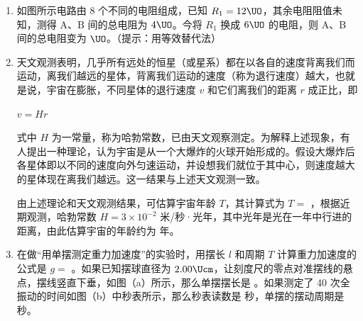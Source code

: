 \documentclass[\gkver]{gaokaozhenti}
\begin{document}
\begin{enumerate}
\item
如图所示电路由 8 个不同的电阻组成，已知 $R_{1} = 12\UO$，其余电阻阻值未知，测得 A、B 间的总电阻为 $4\UO$。今将 $R_{1}$ 换成 $6\UO$ 的电阻，则 A、B 间的总电阻变为  $\UO$。（提示：用等效替代法）
\onepicture[h=4cm, align=right]{}

\item
天文观测表明，几乎所有远处的恒星（或星系）都在以各自的速度背离我们而运动，离我们越远的星体，背离我们运动的速度（称为退行速度）越大，也就是说，宇宙在膨胀，不同星体的退行速度 $v$ 和它们离我们的距离 $r$ 成正比，即

$v = Hr$

式中 $H$ 为一常量，称为哈勃常数，已由天文观察测定。为解释上述现象，有人提出一种理论，认为宇宙是从一个大爆炸的火球开始形成的。假设大爆炸后各星体即以不同的速度向外匀速运动，并设想我们就位于其中心，则速度越大的星体现在离我们越远。这一结果与上述天文观测一致。

由上述理论和天文观测结果，可估算宇宙年龄 $T$，其计算式为 $T =$ ，根据近期观测，哈勃常数 $H = 3\times10^{-2}$ 米/秒·光年，其中光年是光在一年中行进的距离，由此估算宇宙的年龄约为  年。

\item
在做“用单摆测定重力加速度”的实验时，用摆长 $l$ 和周期 $T$ 计算重力加速度的公式是 $g =$ 。如果已知摆球直径为 $2.00\Ucm$，让刻度尺的零点对准摆线的悬点，摆线竖直下垂，如图（a）所示，那么单摆摆长是 。如果测定了 40 次全振动的时间如图（b）中秒表所示，那么秒表读数是  秒，单摆的摆动周期是  秒。


\end{enumerate}
\end{document}
